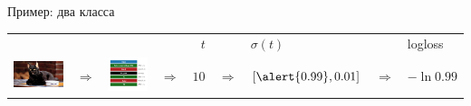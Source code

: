 \documentclass[notes,12pt, aspectratio=169]{beamer}
\begin{document}
\begin{frame}{Пример: два класса}
\begin{tabular}{m{2.5cm} m{0.35cm} m{1.8cm} m{0.35cm} m{0.5cm} m{0.35cm} m{2cm}  m{0.5cm} m{3.2cm}} 
	& & & &  {\large  $\mbox{ }t$ } &  &  {\large \hspace{8pt} $\sigma(t)$} &  &  {\large logloss} \\
	\includegraphics[scale=0.2]{tab_cat.png} & {\Large $\Rightarrow$} & \includegraphics[scale=0.2]{tab_nn.png}  &  {\Large $\Rightarrow$} &  $10$ &  {\Large $\Rightarrow$} &  $[\alert{0.99}, 0.01]$ & {\Large $\Rightarrow$}  & $-\ln 0.99$ \\
	

\end{tabular}
\end{frame}
\end{document}
